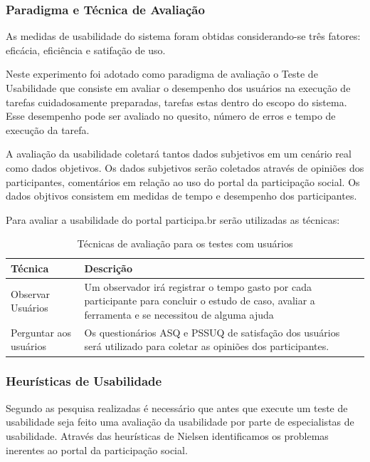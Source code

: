 \subsubsection{Paradigma e Técnica de Avaliação}

As medidas de usabilidade do sistema foram obtidas considerando-se três fatores: eficácia, eficiência e satifação de uso.

Neste experimento foi adotado como paradigma de avaliação o Teste de Usabilidade que consiste em avaliar o desempenho dos usuários na execução de tarefas cuidadosamente preparadas, tarefas estas dentro do escopo do sistema. Esse desempenho pode ser avaliado no quesito, número de erros e tempo de execução da tarefa.

A avaliação da usabilidade coletará tantos dados subjetivos em um cenário real como dados objetivos. Os dados subjetivos serão coletados através de opiniões dos participantes, comentários em relação ao uso do portal da participação social. Os dados objtivos consistem em medidas de tempo e desempenho dos participantes.

Para avaliar a usabilidade do portal participa.br serão utilizadas as técnicas:

\begin{table}[h]
\begin{tabular}{|l| p{10cm} |}
\hline
Técnica & Descrição \\ \hline
Observar Usuários & Um observador irá registrar o tempo 
gasto por cada participante para concluir o estudo de caso, 
avaliar a ferramenta e se necessitou de alguma ajuda    \\ \hline
Perguntar aos usuários & Os questionários ASQ e PSSUQ 
de satisfação dos usuários será utilizado 
para coletar as opiniões dos participantes.\\ \hline
\end{tabular}
\caption{Técnicas de avaliação para os testes com usuários}
\end{table}

\subsubsection{Heurísticas de Usabilidade}

	Segundo as pesquisa realizadas é necessário que antes que execute um teste de usabilidade seja feito uma avaliação da usabilidade por parte de especialistas de usabilidade. Através das heurísticas de Nielsen identificamos os problemas inerentes ao portal da participação social.

